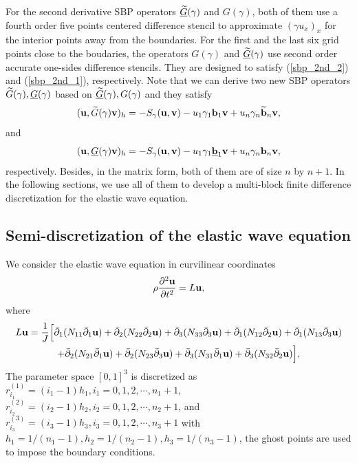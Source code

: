 \documentclass[a4paper]{article}
\newcommand{\wt}{\widetilde}
\begin{document}
For the second derivative SBP operators $\uline{\wt{G}}(\gamma)$ and $G(\gamma)$, both of them use a fourth order five points centered difference stencil to approximate $(\gamma u_x)_x$ for the interior points away from the boundaries. For the first and the last six grid points close to the boudaries, the operators $G(\gamma)$ and $\uline{\wt{G}}(\gamma)$ use second order accurate one-sides difference stencils. They are designed to satisfy (\ref{sbp_2nd_2}) and (\ref{sbp_2nd_1}), respectively.  Note that we can derive two new SBP operators $\wt{G}(\gamma), \uline{G}(\gamma)$ based on $\uline{\wt{G}}(\gamma), G(\gamma)$ and they satisfy
\begin{equation}\label{sbp_2nd_3}
({\bf u}, \wt{G}(\gamma){\bf v})_h = -S_\gamma({\bf u},{\bf v})-u_1\gamma_1{\bf b}_1{\bf v} + u_n\gamma_n\wt{{\bf b}}_n{\bf v},
\end{equation}
and
\begin{equation}\label{sbp_2nd_4}
({\bf u}, \uline{G}(\gamma){\bf v})_h = -S_\gamma({\bf u},{\bf v})-u_1\gamma_1\uline{{\bf b}}_1{\bf v} + u_n\gamma_n{\bf b}_n{\bf v},
\end{equation}
respectively. Besides, in the matrix form, both of them are of size $n$ by $n+1$. In the following sections, we use all of them to develop a multi-block finite difference discretization for the elastic wave equation. 

\subsection{Semi-discretization of the elastic wave equation}

We consider the elastic wave equation in curvilinear coordinates 
\begin{equation}\label{elastic_equation}
\rho\frac{\partial^2 {\bf u}}{\partial t^2} = L{\bf u},
\end{equation}
where 
\begin{multline}\label{spatial_operator}
L{\bf u} = \frac{1}{J}\Big[\bar{\partial}_1(N_{11}\bar{\partial}_1{\bf u}) + \bar{\partial}_2(N_{22}\bar{\partial}_2{\bf u}) + \bar{\partial}_3(N_{33}\bar{\partial}_3{\bf u}) + \bar{\partial}_1(N_{12}\bar{\partial}_2{\bf u}) + \bar{\partial}_1(N_{13}\bar{\partial}_3{\bf u}) \\
+ \bar{\partial}_2(N_{21}\bar{\partial}_1{\bf u}) + \bar{\partial}_2(N_{23}\bar{\partial}_3{\bf u}) +\bar{\partial}_3(N_{31}\bar{\partial}_1{\bf u}) + \bar{\partial}_3(N_{32}\bar{\partial}_2{\bf u})\Big],
\end{multline}
The parameter space $[0,1]^3$ is discretized as $r_{i_1}^{(1)} = (i_1-1)h_1, i_1 = 0,1,2,\cdots,n_1+1$, $r_{i_2}^{(2)} = (i_2-1)h_2, i_2 = 0,1,2,\cdots,n_2+1$, and $r_{i_3}^{(3)} = (i_3-1)h_3, i_3 = 0,1,2,\cdots,n_3+1$ with $h_1 = 1/(n_1-1), h_2 = 1/(n_2-1), h_3 = 1/(n_3-1)$, the ghost points are used to impose the boundary conditions.
\end{document}
